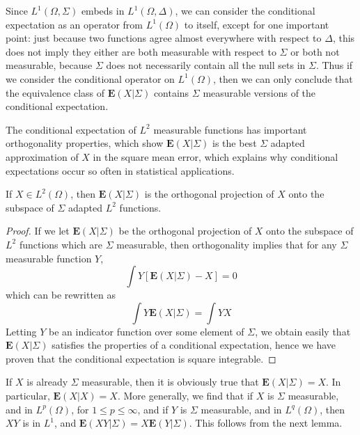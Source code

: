 Since $L^1(\Omega, \Sigma)$ embeds in $L^1(\Omega, \Delta)$, we can consider the conditional expectation as an operator from $L^1(\Omega)$ to itself, except for one important point: just because two functions agree almost everywhere with respect to $\Delta$, this does not imply they either are both measurable with respect to $\Sigma$ or both not measurable, because $\Sigma$ does not necessarily contain all the null sets in $\Sigma$. Thus if we consider the conditional operator on $L^1(\Omega)$, then we can only conclude that the equivalence class of $\mathbf{E}(X|\Sigma)$ contains $\Sigma$ measurable versions of the conditional expectation.

The conditional expectation of $L^2$ measurable functions has important orthogonality properties, which show $\mathbf{E}(X|\Sigma)$ is the best $\Sigma$ adapted approximation of $X$ in the square mean error, which explains why conditional expectations occur so often in statistical applications.

\begin{theorem}
    If $X \in L^2(\Omega)$, then $\mathbf{E}(X|\Sigma)$ is the orthogonal projection of $X$ onto the subspace of $\Sigma$ adapted $L^2$ functions.
\end{theorem}
\begin{proof}
    If we let $\mathbf{E}(X|\Sigma)$ be the orthogonal projection of $X$ onto the subspace of $L^2$ functions which are $\Sigma$ measurable, then orthogonality implies that for any $\Sigma$ measurable function $Y$,
    \[ \int Y[\mathbf{E}(X|\Sigma) - X] = 0 \]
    which can be rewritten as
    \[ \int Y \mathbf{E}(X|\Sigma) = \int YX \]
    Letting $Y$ be an indicator function over some element of $\Sigma$, we obtain easily that $\mathbf{E}(X|\Sigma)$ satisfies the properties of a conditional expectation, hence we have proven that the conditional expectation is square integrable.
\end{proof}

If $X$ is already $\Sigma$ measurable, then it is obviously true that $\mathbf{E}(X|\Sigma) = X$. In particular, $\mathbf{E}(X|X) = X$. More generally, we find that if $X$ is $\Sigma$ measurable, and in $L^p(\Omega)$, for $1 \leq p \leq \infty$, and if $Y$ is $\Sigma$ measurable, and in $L^q(\Omega)$, then $XY$ is in $L^1$, and $\mathbf{E}(XY|\Sigma) = X\mathbf{E}(Y|\Sigma)$. This follows from the next lemma.

